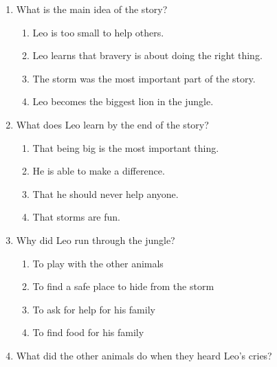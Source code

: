 \documentclass[12pt]{article}
\begin{document}
\begin{enumerate}

    \item What is the main idea of the story?

    \begin{enumerate}[label=\Alph*.]
        \item Leo is too small to help others.
        \item Leo learns that bravery is about doing the right thing.
        \item The storm was the most important part of the story.
        \item Leo becomes the biggest lion in the jungle.
    \end{enumerate}

    \vspace{0.5cm}

    \item What does Leo learn by the end of the story?

    \begin{enumerate}[label=\Alph*.]
        \item That being big is the most important thing.
        \item He is able to make a difference.
        \item That he should never help anyone.
        \item That storms are fun.
    \end{enumerate}

    \vspace{0.5cm}

    \item Why did Leo run through the jungle?

    \begin{enumerate}[label=\Alph*.]
        \item To play with the other animals
        \item To find a safe place to hide from the storm
        \item To ask for help for his family
        \item To find food for his family
    \end{enumerate}

    \vspace{0.5cm}

    \item What did the other animals do when they heard Leo's cries?


\end{enumerate}
\end{document}
